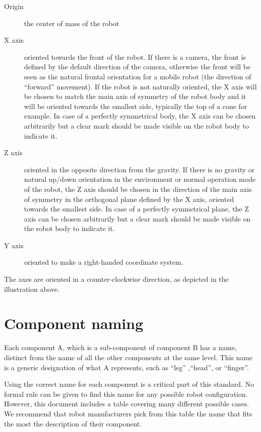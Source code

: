 \begin{description}
\item[Origin] the center of mass of the robot
\item[X axis] oriented towards the front of the robot. If there is a
  camera, the front is defined by the default direction of the camera,
  otherwise the front will be seen as the natural frontal orientation
  for a mobile robot (the direction of ``forward'' movement). If the
  robot is not naturally oriented, the X axis will be chosen to match
  the main axis of symmetry of the robot body and it will be oriented
  towards the smallest side, typically the top of a cone for
  example. In case of a perfectly symmetrical body, the X axis can be
  chosen arbitrarily but a clear mark should be made visible on the
  robot body to indicate it.
\item[Z axis] oriented in the opposite direction from the gravity. If
  there is no gravity or natural up/down orientation in the
  environment or normal operation mode of the robot, the Z axis should
  be chosen in the direction of the main axis of symmetry in the
  orthogonal plane defined by the X axis, oriented towards the
  smallest side. In case of a perfectly symmetrical plane, the Z axis
  can be chosen arbitrarily but a clear mark should be made visible on
  the robot body to indicate it.
\item[Y axis] oriented to make a right-handed coordinate system.
\end{description}


The axes are oriented in a counter-clockwise direction, as depicted in
the illustration above.

\section{Component naming}

Each component A, which is a sub-component of component B has a name, distinct
from the name of all the other components at the same level.
This name is a generic designation of what A represents, such as ``leg''
,``head'', or ``finger''.

Using the correct name for each component is a critical part of this standard.
No formal rule can be given to find this name for any possible robot
configuration. However, this document includes a table covering many different
possible cases. We recommend that robot manufacturers pick from this table
the name that fits the most the description of their component.

